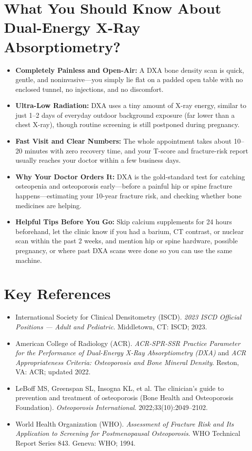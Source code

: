 \section{What You Should Know About Dual-Energy X-Ray Absorptiometry?}
\begin{itemize}
\item \textbf{Completely Painless and Open-Air:} A DXA bone density scan is quick, gentle, and noninvasive---you simply lie flat on a padded open table with no enclosed tunnel, no injections, and no discomfort.
\item \textbf{Ultra-Low Radiation:} DXA uses a tiny amount of X-ray energy, similar to just 1--2 days of everyday outdoor background exposure (far lower than a chest X-ray), though routine screening is still postponed during pregnancy.
\item \textbf{Fast Visit and Clear Numbers:} The whole appointment takes about 10--20 minutes with zero recovery time, and your T-score and fracture-risk report usually reaches your doctor within a few business days.
\item \textbf{Why Your Doctor Orders It:} DXA is the gold-standard test for catching osteopenia and osteoporosis early---before a painful hip or spine fracture happens---estimating your 10-year fracture risk, and checking whether bone medicines are helping.
\item \textbf{Helpful Tips Before You Go:} Skip calcium supplements for 24 hours beforehand, let the clinic know if you had a barium, CT contrast, or nuclear scan within the past 2 weeks, and mention hip or spine hardware, possible pregnancy, or where past DXA scans were done so you can use the same machine.
\end{itemize}

\section{Key References}
\begin{itemize}
\item International Society for Clinical Densitometry (ISCD). \textit{2023 ISCD Official Positions --- Adult and Pediatric}. Middletown, CT: ISCD; 2023.
\item American College of Radiology (ACR). \textit{ACR-SPR-SSR Practice Parameter for the Performance of Dual-Energy X-Ray Absorptiometry (DXA)} and \textit{ACR Appropriateness Criteria: Osteoporosis and Bone Mineral Density}. Reston, VA: ACR; updated 2022.
\item LeBoff MS, Greenspan SL, Insogna KL, et al. The clinician's guide to prevention and treatment of osteoporosis (Bone Health and Osteoporosis Foundation). \textit{Osteoporosis International}. 2022;33(10):2049--2102.
\item World Health Organization (WHO). \textit{Assessment of Fracture Risk and Its Application to Screening for Postmenopausal Osteoporosis}. WHO Technical Report Series 843. Geneva: WHO; 1994.
\end{itemize}
